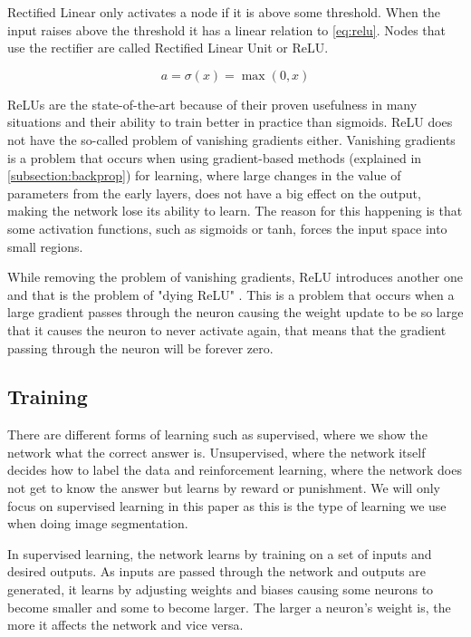 Rectified Linear only activates a node if it is above some threshold. When the input raises above the threshold it has a linear relation to \autoref{eq:relu}. Nodes that use the rectifier are called Rectified Linear Unit or ReLU. 

\begin{equation}
\label{eq:relu}
a = \sigma(x) = \max(0, x)
\end{equation}


ReLUs are the state-of-the-art because of their proven usefulness in many situations and their ability to train better in practice than sigmoids. ReLU does not have the so-called problem of vanishing gradients either. Vanishing gradients is a problem that occurs when using gradient-based methods (explained in \autoref{subsection:backprop}) for learning, where large changes in the value of parameters from the early layers, does not have a big effect on the output, making the network lose its ability to learn. The reason for this happening is that some activation functions, such as sigmoids or tanh, forces the input space into small regions. 

While removing the problem of vanishing gradients, ReLU introduces another one and that is the problem of "dying ReLU" \cite{Li}. This is a problem that occurs when a large gradient passes through the neuron causing the weight update to be so large that it causes the neuron to never activate again, that means that the gradient passing through the neuron will be forever zero.


\subsection{Training}
There are different forms of learning such as supervised, where we show the network what the correct answer is. Unsupervised, where the network itself decides how to label the data and reinforcement learning, where the network does not get to know the answer but learns by reward or punishment. We will only focus on supervised learning in this paper as this is the type of learning we use when doing image segmentation.

In supervised learning, the network learns by training on a set of inputs and desired outputs. As inputs are passed through the network and outputs are generated, it learns by adjusting weights and biases causing some neurons to become smaller and some to become larger. The larger a neuron's weight is, the more it affects the network and vice versa.

